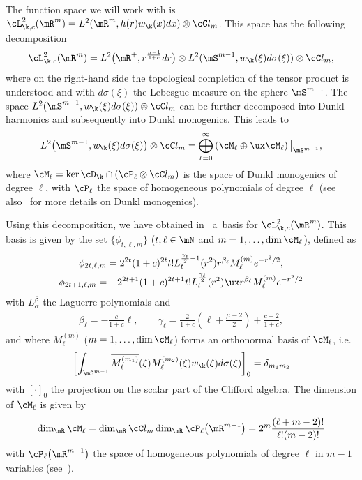 The function space we will work with is $\cL^{2}_{\k,c}(\mR^{m})=L^{2}(\mR^{m},h(r)w_{\k}(x)dx)
\otimes\cC l_{m}$.
This space has the following decomposition
\begin{gather*}
\cL^{2}_{\k,c}(\mR^{m})=L^{2}\big(\mR^{+},r^{\frac{\mu-1}{1+c}}dr\big)\otimes
L^{2}(\mS^{m-1},w_{\k}(\xi)d\sigma(\xi))\otimes\cC l_{m},
\end{gather*}
where on the right-hand side the topological completion of the tensor product is understood and
with $d\sigma(\xi)$ the Lebesgue measure on the sphere $\mS^{m-1}$.
The space $L^{2}(\mS^{m-1},w_{\k}(\xi)d\sigma(\xi))\otimes\cC l_{m}$ can be further decomposed
into Dunkl harmonics and subsequently into Dunkl monogenics.
This leads to
\begin{gather*}
L^{2}\big(\mS^{m-1},w_{\k}(\xi)d\sigma(\xi)\big)\otimes\cC l_{m}=\bigoplus_{\ell=0}^{\infty}
\left(\cM_{\ell}\oplus\ux\cM_{\ell}\right)\big|_{\mS^{m-1}},
\end{gather*}
where $\cM_{\ell}=\ker{\cD_{\k}}\cap\left(\cP_{\ell}\otimes\cC l_{m}\right)$ is the space
of Dunkl monogenics of degree $\ell$, with $\cP_{\ell}$ the space of homogeneous polynomials of
degree $\ell$ (see also~\cite{DBGeg} for more details on Dunkl monogenics).

Using this decomposition, we have obtained in~\cite{H12} a~basis for $\cL^{2}_{\k,c}(\mR^{m})$.
This basis is given by the set $\{\phi_{t,\ell,m}\}$ ($t,\ell\in\mN$ and $m=1,\ldots,\dim
\cM_{\ell}$), def\/ined as
\begin{gather*}
\phi_{2t,\ell,m} = 2^{2t} (1+c)^{2t} t! L_{t}^{\frac{\gamma_{\ell}}{2} -1}(r^{2})r^{\beta_{\ell}}
M_{\ell}^{(m)} e^{-r^{2}/2},\\
\phi_{2t+1,\ell,m} = - 2^{2t+1} (1+c)^{2t+1} t! L_{t}^{\frac{\gamma_{\ell}}{2}}(r^{2}) \ux
r^{\beta_{\ell}} M_{\ell}^{(m)} e^{-r^{2}/2}
\end{gather*}
with $L_{\alpha}^{\beta}$ the Laguerre polynomials and
\begin{gather*}
\beta_{\ell} = - \frac{c}{1+c}\ell,\qquad
\gamma_{\ell} = \frac{2}{1+c}\left( \ell + \frac{\mu-2}{2}\right) + \frac{c+2}{1+c},
\end{gather*}
and where $M_{\ell}^{(m)}$ ($m=1,\ldots,\dim\cM_{\ell}$) forms an orthonormal basis of
$\cM_{\ell}$, i.e.
\begin{gather*}
\left[\int_{\mS^{m-1}}\overline{M_{\ell}^{(m_{1})}}(\xi)M_{\ell}^{(m_{2})}(\xi)w_{\k}(\xi)
d\sigma(\xi)\right]_{0}=\delta_{m_{1}m_{2}}
\end{gather*}
with $[\cdot]_0$ the projection on the scalar part of the Clif\/ford algebra.
The dimension of $\cM_{\ell}$ is given by
\begin{gather*}
\dim_{\mR}{\cM_{\ell}} = \dim_{\mR}{\cC l_{m}} \dim_{\mR}{\cP_{\ell}\big(\mR^{m-1}\big)}
=2^{m} \frac{(\ell +m-2)!}{\ell! (m-2)!}
\end{gather*}
with $\cP_{\ell}\big(\mR^{m-1}\big)$ the space of homogeneous polynomials of degree $\ell$ in $m-1$
variables (see~\cite{MR1169463}).

